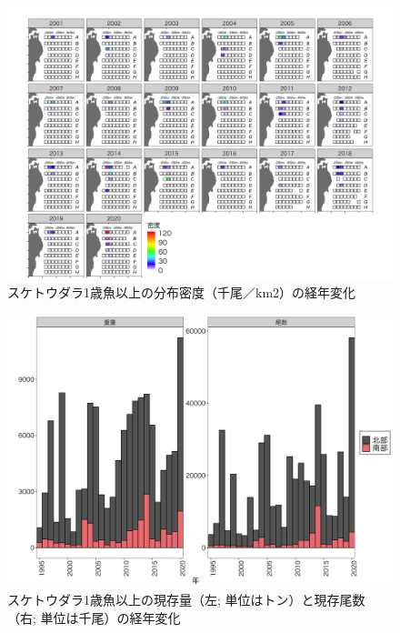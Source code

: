 \documentclass[11pt]{article} %
\begin{document}
\begin{linenumbers}
\begin{figure}[h]
  \centering
  \includegraphics[width = 14cm]{スケトウダラ１＋dens.png}
  \caption{スケトウダラ1歳魚以上の分布密度（千尾／km2）の経年変化}
\end{figure}

\begin{figure}[h]
  \centering
  \includegraphics[width = 14cm]{スケトウダラ１＋trend.png}
  \caption{スケトウダラ1歳魚以上の現存量（左; 単位はトン）と現存尾数（右; 単位は千尾）の経年変化}
\end{figure}


\end{linenumbers}
\end{document}
